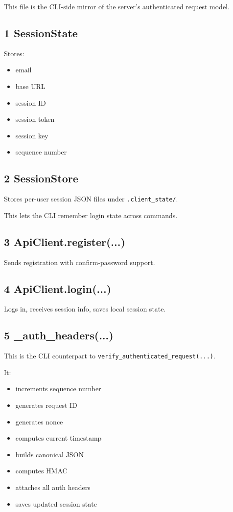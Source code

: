 \documentclass[11pt,a4paper]{article}
\begin{document}
This file is the CLI-side mirror of the server's authenticated request model.

\subsection{1 SessionState}

Stores:

\begin{itemize}
\item email
\item base URL
\item session ID
\item session token
\item session key
\item sequence number
\end{itemize}

\subsection{2 SessionStore}

Stores per-user session JSON files under \nolinkurl{.client_state/}.

This lets the CLI remember login state across commands.

\subsection{3 ApiClient.register(...)}

Sends registration with confirm-password support.

\subsection{4 ApiClient.login(...)}

Logs in, receives session info, saves local session state.

\subsection{5 \_auth\_headers(...)}

This is the CLI counterpart to \nolinkurl{verify_authenticated_request(...)}.

It:

\begin{itemize}
\item increments sequence number
\item generates request ID
\item generates nonce
\item computes current timestamp
\item builds canonical JSON
\item computes HMAC
\item attaches all auth headers
\item saves updated session state
\end{itemize}
\end{document}
